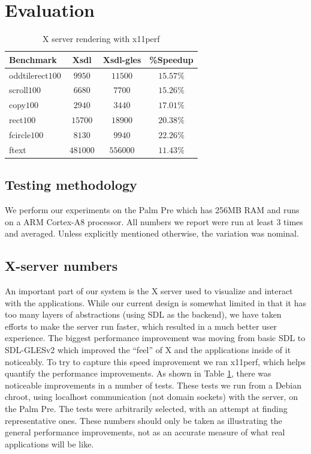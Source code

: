 \section{Evaluation}
\label{sec:eval}

\begin{table}[ht]
{\small
\hfill{}
\begin{tabular}{|l|c|c|c|}
\hline Benchmark & Xsdl & Xsdl-gles & \%Speedup \\ [2pt] 
\hline oddtilerect$100$ & $9950$ & $11500$ & $15.57\%$ \\ [2pt]
scroll$100$ & $6680$ & $7700$ & $15.26\%$ \\ [2pt]
copy$100$ & $2940$ & $3440$ & $17.01\%$ \\ [2pt]
rect$100$ & $15700$ & $18900$ & $20.38\%$ \\ [2pt]
fcircle$100$ & $8130$ & $9940$ & $22.26\%$ \\ [2pt]
ftext & $481000$ & $556000$ & $11.43\%$ \\ [2pt]
\hline 
\end{tabular}}
\hfill{}
\caption{ X server rendering with x11perf }
\label{tab:x_results}
\end{table}

\subsection{Testing methodology}
We perform our experiments on the Palm Pre which has 256MB RAM and runs on a ARM Cortex-A8 processor. All numbers we report were run at least 3 times and averaged.  Unless explicitly mentioned otherwise, the variation was nominal.

\subsection{X-server numbers}
\label{sec:x_eval}

An important part of our system is the X server used to visualize and interact with the applications.  While our current design is somewhat limited in that it has too many layers of abstractions (using SDL as the backend), we have taken efforts to make the server run faster, which resulted in a much better user experience.  The biggest  performance improvement was moving from basic SDL to SDL-GLESv2 which improved the ``feel'' of X and the applications inside of it noticeably.  To try to capture this speed improvement we ran x11perf, which helps quantify the performance improvements.  As shown in Table \ref{tab:x_results}, there was noticeable improvements in a number of tests.
These tests we run from a Debian chroot, using localhost communication (not domain sockets) with the server, on the Palm Pre.  The tests were arbitrarily selected, with an attempt at finding representative ones.  These numbers should only be taken as illustrating the general performance improvements, not as an accurate measure of what real applications will be like.

